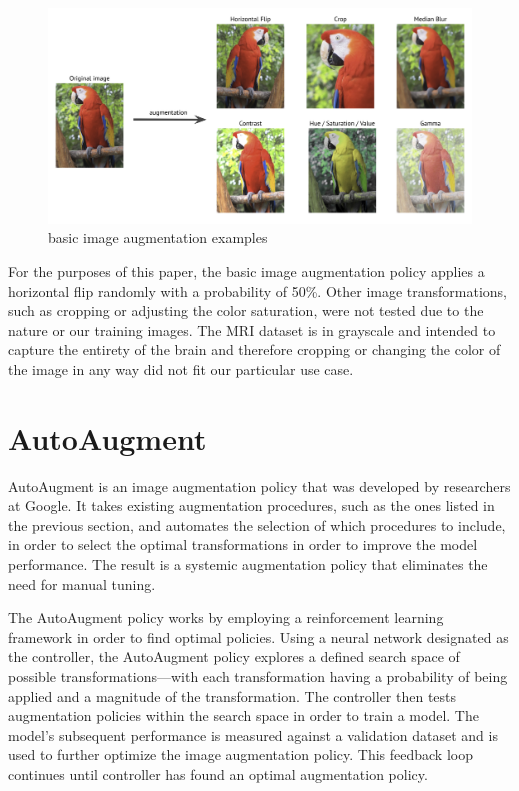 \documentclass [MS] {uclathes}
\begin{document}
\begin{figure} [H]
    \centering
    \includegraphics[width=0.75\linewidth]{figures/basic-image-augmentation-example.png}
    \caption{basic image augmentation examples}
    \label{fig:basic image augmentation examples}
\end{figure}

For the purposes of this paper, the basic image augmentation policy applies a horizontal flip randomly with a 
probability of 50\%. Other image transformations, such as cropping or adjusting the color saturation, were not tested 
due to the nature or our training images. The MRI dataset is in grayscale and intended to capture the entirety of the 
brain and therefore cropping or changing the color of the image in any way did not fit our particular use case. 

\section{AutoAugment}
AutoAugment is an image augmentation policy that was developed by researchers at Google. It takes existing augmentation 
procedures, such as the ones listed in the previous section, and automates the selection of which procedures to include,
in order to select the optimal transformations in order to improve the model performance. The result is a systemic 
augmentation policy that eliminates the need for manual tuning. 

The AutoAugment policy works by employing a reinforcement learning framework in order to find optimal policies. Using a 
neural network designated as the controller, the AutoAugment policy explores a defined search space of possible 
transformations---with each transformation having a probability of being applied and a magnitude of the transformation.
The controller then tests augmentation policies within the search space in order to train a model. The model's 
subsequent performance is measured against a validation dataset and is used to further optimize the image augmentation 
policy. This feedback loop continues until controller has found an optimal augmentation policy.
\end{document}

